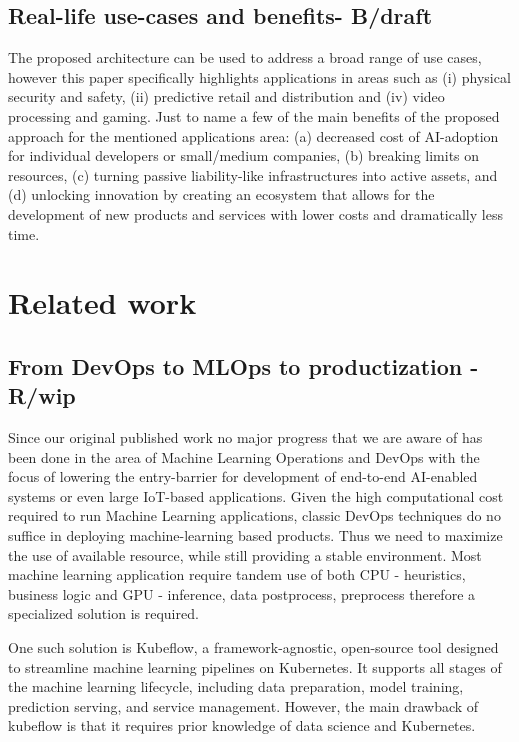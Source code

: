 \documentclass{article}
\begin{document}
\subsection{Real-life use-cases and benefits- B/draft}
The proposed architecture can be used to address a broad range of use cases, however this paper specifically highlights applications in areas such as (i) physical security and safety, (ii) predictive retail and distribution and (iv) video processing and gaming. 
Just to name a few of the main benefits of the proposed approach for the mentioned applications area: (a) decreased cost of AI-adoption for individual developers or small/medium companies, (b) breaking limits on resources, (c) turning passive liability-like infrastructures into active assets, and (d) unlocking innovation by creating an ecosystem that allows for the development of new products and services with lower costs and dramatically less time.
\newline

\section{Related work}
\subsection{From DevOps to MLOps to productization - R/wip}
Since our original published work\cite{ciobanu2021solis} no major progress that we are aware of has been done in the area of Machine Learning Operations and DevOps with the focus of lowering the entry-barrier for development of end-to-end AI-enabled systems or even large IoT-based applications.
Given the high computational cost required to run Machine Learning applications, classic DevOps techniques do no suffice in deploying machine-learning based products. Thus we need to maximize the use of available resource, while still providing a stable environment. Most machine learning application require tandem use of both CPU - heuristics, business logic and GPU - inference, data postprocess, preprocess therefore a specialized solution is required.

One such solution is Kubeflow, a framework-agnostic, open-source tool designed to streamline machine learning pipelines on Kubernetes. It supports all stages of the machine learning lifecycle, including data preparation, model training, prediction serving, and service management. However, the main drawback of kubeflow is that it requires prior knowledge of data science and Kubernetes.
\end{document}
